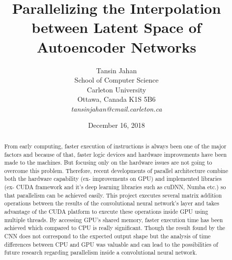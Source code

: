 \documentclass[11pt]{article}       %
\begin{document}


\title{Parallelizing the Interpolation between Latent Space of Autoencoder
Networks}


\author{
Tansin Jahan\\
School of Computer Science\\
Carleton University\\
Ottawa, Canada K1S 5B6\\
{\em tansinjahan@cmail.carleton.ca}
} %
\date{December 16, 2018}
\maketitle

\begin{abstract}
From early computing, faster execution of instructions is always been one of the major factors and because of that, faster logic devices and hardware improvements have been made to the machines. But focusing only on the hardware issues are not going to overcome this problem. Therefore, recent developments of parallel architecture combine both the hardware capability (ex- improvements on GPU) and implemented libraries (ex- CUDA framework and it's deep learning libraries such as cuDNN, Numba etc.) so that parallelism can be achieved easily. This project executes several matrix addition operations between the results of the convolutional neural network's layer and takes advantage of the CUDA platform to execute these operations inside GPU using multiple threads. By accessing GPU's shared memory, faster execution time has been achieved which compared to CPU is really significant. Though the result found by the CNN does not correspond to the expected output shape but the analysis of time differences between CPU and GPU was valuable and can lead to the possibilities of future research regarding parallelism inside a convolutional neural network.       
\end{abstract}
\end{document}
